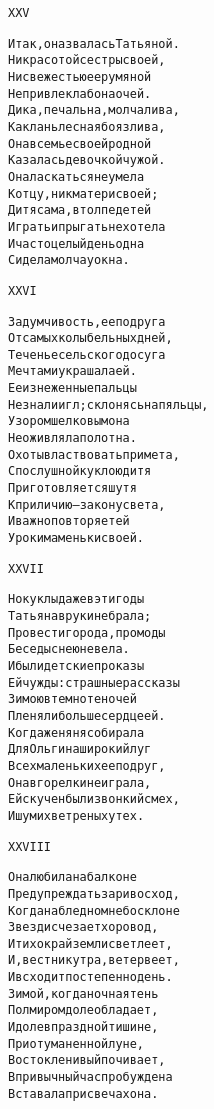 \begin{minipage}[t]{\dimexpr 0.5\textwidth -\tabcolsep-.5pt}
\begin{alltt}\normalfont\centering
XXV

Итак, она звалась Татьяной.
Ни красотой сестры своей,
Ни свежестью ее румяной
Не привлекла б она очей.
Дика, печальна, молчалива,
Как лань лесная боязлива,
Она в семье своей родной
Казалась девочкой чужой.
Она ласкаться не умела
К отцу, ни к матери своей;
Дитя сама, в толпе детей
Играть и прыгать не хотела
И часто целый день одна
Сидела молча у окна.
\end{alltt}
\end{minipage}

\begin{minipage}[t]{\dimexpr 0.5\textwidth -\tabcolsep-.5pt}
\begin{alltt}\normalfont\centering
XXVI

Задумчивость, ее подруга
От самых колыбельных дней,
Теченье сельского досуга
Мечтами украшала ей.
Ее изнеженные пальцы
Не знали игл; склонясь на пяльцы,
Узором шелковым она
Не оживляла полотна.
Охоты властвовать примета,
С послушной куклою дитя
Приготовляется шутя
К приличию — закону света,
И важно повторяет ей
Уроки маменьки своей.
\end{alltt}
\end{minipage}
\clearpage

\begin{minipage}[t]{\dimexpr 0.5\textwidth -\tabcolsep-.5pt}
\begin{alltt}\normalfont\centering
XXVII

Но куклы даже в эти годы
Татьяна в руки не брала;
Про вести города, про моды
Беседы с нею не вела.
И были детские проказы
Ей чужды: страшные рассказы
Зимою в темноте ночей
Пленяли больше сердце ей.
Когда же няня собирала
Для Ольги на широкий луг
Всех маленьких ее подруг,
Она в горелки не играла,
Ей скучен был и звонкий смех,
И шум их ветреных утех.
\end{alltt}
\end{minipage}

\begin{minipage}[t]{\dimexpr 0.5\textwidth -\tabcolsep-.5pt}
\begin{alltt}\normalfont\centering
XXVIII

Она любила на балконе
Предупреждать зари восход,
Когда на бледном небосклоне
Звезд исчезает хоровод,
И тихо край земли светлеет,
И, вестник утра, ветер веет,
И всходит постепенно день.
Зимой, когда ночная тень
Полмиром доле обладает,
И доле в праздной тишине,
При отуманенной луне,
Восток ленивый почивает,
В привычный час пробуждена
Вставала при свечах она.
\end{alltt}
\end{minipage}
\clearpage

